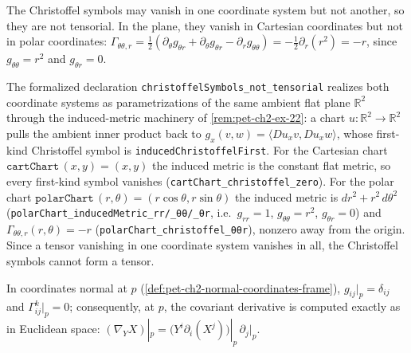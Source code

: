 \begin{remark}
  \label{rem:pet-ch2-christoffel-non-tensorial}
  \leanok
  The Christoffel symbols may vanish in one coordinate system but not
  another, so they are not tensorial. In the plane, they vanish in Cartesian
  coordinates but not in polar coordinates: $\Gamma_{\theta\theta,r}
  =\tfrac12(\partial_\theta g_{\theta r}+\partial_\theta g_{\theta r}-\partial_rg_{\theta\theta})
  =-\tfrac12\partial_r(r^2)=-r$, since $g_{\theta\theta}=r^2$ and $g_{\theta r}=0$.

  The formalized declaration \texttt{christoffelSymbols\_not\_tensorial}
  realizes both coordinate systems as parametrizations of the same ambient flat
  plane $\mathbb{R}^2$ through the induced-metric machinery of
  \cref{rem:pet-ch2-ex-22}: a chart $u:\mathbb{R}^2\to\mathbb{R}^2$ pulls the
  ambient inner product back to $g_x(v,w)=\langle Du_xv,Du_xw\rangle$, whose
  first-kind Christoffel symbol is \texttt{inducedChristoffelFirst}. For the
  Cartesian chart $\texttt{cartChart}\,(x,y)=(x,y)$ the induced metric is the
  constant flat metric, so every first-kind symbol vanishes
  (\texttt{cartChart\_christoffel\_zero}). For the polar chart
  $\texttt{polarChart}\,(r,\theta)=(r\cos\theta,r\sin\theta)$ the induced metric
  is $dr^2+r^2\,d\theta^2$ (\texttt{polarChart\_inducedMetric\_rr/\_θθ/\_θr},
  i.e.\ $g_{rr}=1$, $g_{\theta\theta}=r^2$, $g_{\theta r}=0$) and
  $\Gamma_{\theta\theta,r}(r,\theta)=-r$
  (\texttt{polarChart\_christoffel\_θθr}), nonzero away from the origin. Since a
  tensor vanishing in one coordinate system vanishes in all, the Christoffel
  symbols cannot form a tensor.
\end{remark}

\begin{remark}
  \label{rem:pet-ch2-christoffel-normal-coordinates}
  \leanok
  In coordinates normal at $p$ (\cref{def:pet-ch2-normal-coordinates-frame}),
  $g_{ij}|_p=\delta_{ij}$ and $\Gamma^k_{ij}|_p=0$; consequently, at $p$, the
  covariant derivative is computed exactly as in Euclidean space:
  $(\nabla_YX)|_p=\big(Y^i\partial_i(X^j)\big)|_p\,\partial_j|_p$.
\end{remark}

